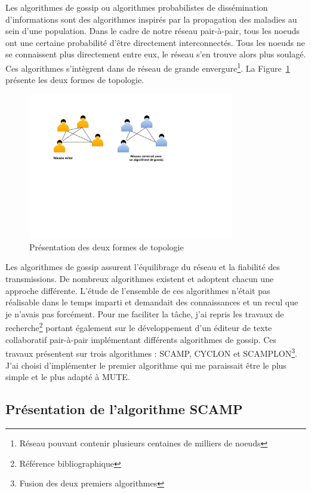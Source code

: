 \documentclass{tnreport}
\begin{document}
Les algorithmes de gossip ou algorithmes probabilistes de dissémination d'informations sont des algorithmes inspirés par la propagation des maladies au sein d'une population. Dans le cadre de notre réseau pair-à-pair, tous les noeuds ont une certaine probabilité d'être directement interconnectés. Tous les noeuds ne se connaissent plus directement entre eux, le réseau s'en trouve alors plus soulagé. Ces algorithmes s'intègrent dans de réseau de grande envergure\footnote{Réseau pouvant contenir plusieurs centaines de milliers de noeuds}.  La Figure~\ref{fig:topo-comp} présente les deux formes de topologie.

\begin{figure}[!h]
  \centering
  \includegraphics[width=9cm]{figures/topo-comp}
  \caption{Présentation des deux formes de topologie}
  \label{fig:topo-comp}
\end{figure}

Les algorithmes de gossip assurent l'équilibrage du réseau et la fiabilité des transmissions. De nombreux algorithmes existent et adoptent chacun une approche différente. L'étude de l'ensemble de ces algorithmes n'était pas réalisable dans le temps imparti et demandait des connaissances et un recul que je n'avais pas forcément. Pour me faciliter la tâche, j'ai repris les travaux de recherche\footnote{Référence bibliographique\cite{SCAMPLON}} portant également sur le développement d'un éditeur de texte collaboratif pair-à-pair implémentant différents algorithmes de gossip. Ces travaux présentent sur trois algorithmes : SCAMP, CYCLON et SCAMPLON\footnote{Fusion des deux premiers algorithmes}. J'ai choisi d'implémenter le premier algorithme qui me paraissait être le plus simple et le plus adapté à MUTE.

\subsection{Présentation de l'algorithme SCAMP}
\end{document}

